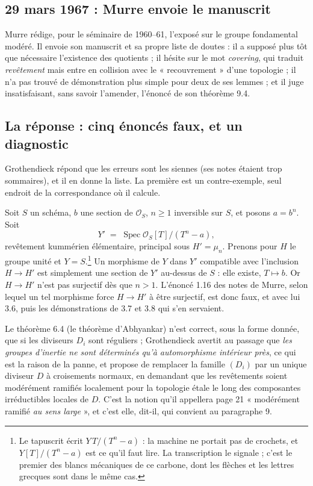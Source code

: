\documentclass[11pt,a4paper]{article}
\begin{document}
\subsection*{29 mars 1967 : Murre envoie le manuscrit}

Murre rédige, pour le séminaire de 1960--61, l'exposé sur le groupe fondamental
modéré. Il envoie son manuscrit et sa propre liste de doutes : il a supposé
plus tôt que nécessaire l'existence des quotients ; il hésite sur le mot
\emph{covering}, qui traduit \emph{revêtement} mais entre en collision avec le
« recouvrement » d'une topologie ; il n'a pas trouvé de démonstration plus
simple pour deux de ses lemmes ; et il juge insatisfaisant, sans savoir
l'amender, l'énoncé de son théorème 9.4.

\subsection*{La réponse : cinq énoncés faux, et un diagnostic}

Grothendieck répond que les erreurs sont les siennes (ses notes étaient trop
sommaires), et il en donne la liste. La première est un contre-exemple, seul
endroit de la correspondance où il calcule.

Soit $S$ un schéma, $b$ une section de $\mathcal{O}_{S}$, $n \geqslant 1$
inversible sur $S$, et posons $a = b^{n}$. Soit
\[
  Y' \;=\; \operatorname{Spec} \mathcal{O}_{S}[T]/(T^{n} - a) ,
\]
revêtement kummérien élémentaire, principal sous $H' = \mu_{n}$. Prenons pour
$H$ le groupe unité et $Y = S$.\footnote{Le tapuscrit écrit $Y\,T/(T^{n}-a)$ :
la machine ne portait pas de crochets, et $Y[T]/(T^{n}-a)$ est ce qu'il faut
lire. La transcription le signale ; c'est le premier des blancs mécaniques de
ce carbone, dont les flèches et les lettres grecques sont dans le même cas.}
Un morphisme de $Y$ dans $Y'$ compatible avec l'inclusion $H \to H'$ est
simplement une section de $Y'$ au-dessus de $S$ : elle existe, $T \mapsto b$.
Or $H \to H'$ n'est pas surjectif dès que $n > 1$. L'énoncé 1.16 des notes de
Murre, selon lequel un tel morphisme force $H \to H'$ à être surjectif, est donc
faux, et avec lui 3.6, puis les démonstrations de 3.7 et 3.8 qui s'en
servaient.

Le théorème 6.4 (le théorème d'Abhyankar) n'est correct, sous la forme donnée,
que si les diviseurs $D_{i}$ sont réguliers ; Grothendieck avertit au passage
que \emph{les groupes d'inertie ne sont déterminés qu'à automorphisme intérieur
près}, ce qui est la raison de la panne, et propose de remplacer la famille
$(D_{i})$ par un unique diviseur $D$ à croisements normaux, en demandant que
les revêtements soient modérément ramifiés localement pour la topologie étale
le long des composantes irréductibles locales de $D$. C'est la notion qu'il
appellera page 21 « modérément ramifié \emph{au sens large} », et c'est elle,
dit-il, qui convient au paragraphe 9.
\end{document}
